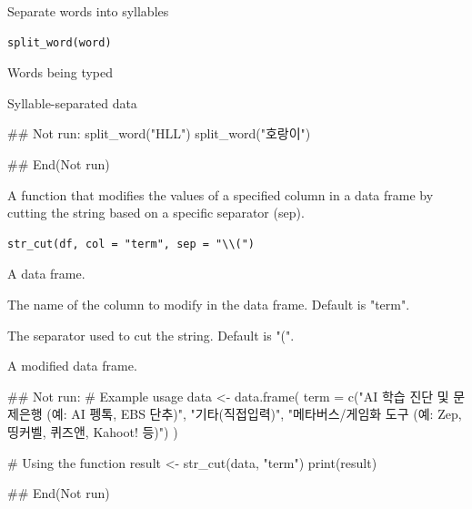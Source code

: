 \documentclass[a4paper]{book}
\begin{document}
%
\begin{Description}
Separate words into syllables
\end{Description}
%
\begin{Usage}
\begin{verbatim}
split_word(word)
\end{verbatim}
\end{Usage}
%
\begin{Arguments}
\begin{ldescription}
\item[\code{word}] Words being typed
\end{ldescription}
\end{Arguments}
%
\begin{Value}
Syllable-separated data
\end{Value}
%
\begin{Examples}
\begin{ExampleCode}

\#\# Not run: 
split_word("HLL")
split_word("호랑이")


## End(Not run)

\end{ExampleCode}
\end{Examples}

%
\begin{Description}
A function that modifies the values of a specified column in a data frame by cutting the string based on a specific separator (sep).
\end{Description}
%
\begin{Usage}
\begin{verbatim}
str_cut(df, col = "term", sep = "\\(")
\end{verbatim}
\end{Usage}
%
\begin{Arguments}
\begin{ldescription}
\item[\code{df}] A data frame.

\item[\code{col}] The name of the column to modify in the data frame. Default is "term".

\item[\code{sep}] The separator used to cut the string. Default is "\bsl{}(".
\end{ldescription}
\end{Arguments}
%
\begin{Value}
A modified data frame.
\end{Value}
%
\begin{Examples}
\begin{ExampleCode}
\#\# Not run: 
# Example usage
data <- data.frame(
  term = c("AI 학습 진단 및 문제은행 (예: AI 펭톡, EBS 단추)",
           "기타(직접입력)",
           "메타버스/게임화 도구 (예: Zep, 띵커벨, 퀴즈앤, Kahoot! 등)")
)

# Using the function
result <- str_cut(data, "term")
print(result)

## End(Not run)
\end{ExampleCode}
\end{Examples}
\end{document}
